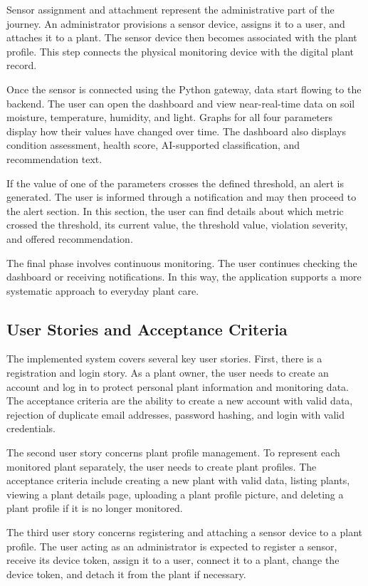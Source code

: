 Sensor assignment and attachment represent the administrative part of the journey. An administrator provisions a sensor device, assigns it to a user, and attaches it to a plant. The sensor device then becomes associated with the plant profile. This step connects the physical monitoring device with the digital plant record.

Once the sensor is connected using the Python gateway, data start flowing to the backend. The user can open the dashboard and view near-real-time data on soil moisture, temperature, humidity, and light. Graphs for all four parameters display how their values have changed over time. The dashboard also displays condition assessment, health score, AI-supported classification, and recommendation text.

If the value of one of the parameters crosses the defined threshold, an alert is generated. The user is informed through a notification and may then proceed to the alert section. In this section, the user can find details about which metric crossed the threshold, its current value, the threshold value, violation severity, and offered recommendation.

The final phase involves continuous monitoring. The user continues checking the dashboard or receiving notifications. In this way, the application supports a more systematic approach to everyday plant care.

\subsection{User Stories and Acceptance Criteria}
\label{subsec:user-stories-acceptance-criteria}

The implemented system covers several key user stories. First, there is a registration and login story. As a plant owner, the user needs to create an account and log in to protect personal plant information and monitoring data. The acceptance criteria are the ability to create a new account with valid data, rejection of duplicate email addresses, password hashing, and login with valid credentials.

The second user story concerns plant profile management. To represent each monitored plant separately, the user needs to create plant profiles. The acceptance criteria include creating a new plant with valid data, listing plants, viewing a plant details page, uploading a plant profile picture, and deleting a plant profile if it is no longer monitored.

The third user story concerns registering and attaching a sensor device to a plant profile. The user acting as an administrator is expected to register a sensor, receive its device token, assign it to a user, connect it to a plant, change the device token, and detach it from the plant if necessary.

